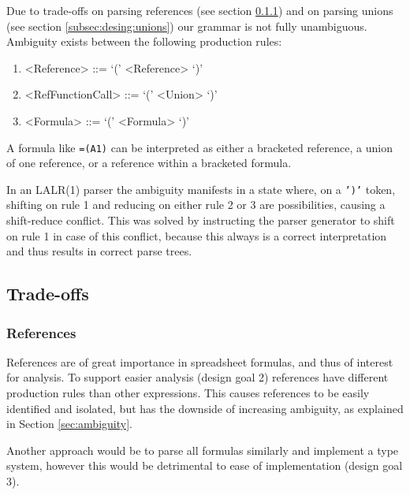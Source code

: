 \documentclass[conference]{IEEEtran}
\begin{document}
Due to trade-offs on parsing references (see section \ref{tradeoff:references}) and on parsing unions (see section \ref{subsec:desing:unions}) our grammar is not fully unambiguous.
Ambiguity exists between the following production rules:
\begin{enumerate}
\item \begin{grammar}<Reference> ::= `(' <Reference> `)'\end{grammar}
\item \begin{grammar}<RefFunctionCall> ::= `(' <Union> `)'\end{grammar}
\item \begin{grammar}<Formula> ::= `(' <Formula> `)'\end{grammar}
\end{enumerate}

A formula like \texttt{=(A1)} can be interpreted as either a bracketed reference, a union of one reference, or a reference within a bracketed formula.

In an LALR(1) parser the ambiguity manifests in a state where, on a \texttt{')'} token, shifting on rule 1 and reducing on either rule 2 or 3 are possibilities, causing a shift-reduce conflict.
This was solved by instructing the parser generator to shift on rule 1 in case of this conflict, because this always is a correct interpretation and thus results in correct parse trees.

\subsection{Trade-offs}

\subsubsection{\textbf{References}}
\label{tradeoff:references}

References are of great importance in spreadsheet formulas, and thus of interest for analysis.
To support easier analysis (design goal 2) references have different production rules than other expressions.
This causes references to be easily identified and isolated, but has the downside of increasing ambiguity, as explained in Section \ref{sec:ambiguity}. 

Another approach would be to parse all formulas similarly and implement a type system, however this would be detrimental to ease of implementation (design goal 3).
\end{document}
